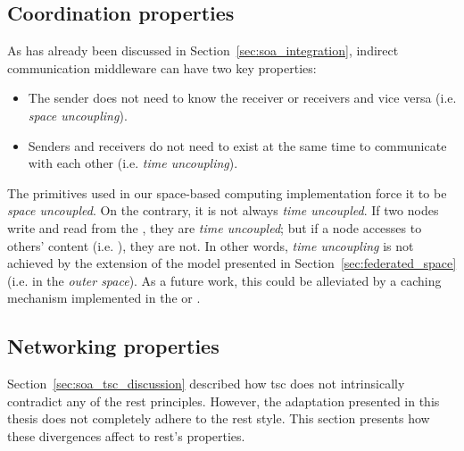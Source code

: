 \subsection{Coordination properties}
\label{sec:coordination_properties}

As has already been discussed in Section~\ref{sec:soa_integration}, indirect communication middleware can have two key properties:
\begin{itemize}
  \item The sender does not need to know the receiver or receivers and vice versa (i.e. \emph{space uncoupling}).
  \item Senders and receivers do not need to exist at the same time to communicate with each other (i.e. \emph{time uncoupling}).
\end{itemize}


The primitives used in our space-based computing implementation force it to be \emph{space uncoupled}.
On the contrary, it is not always \emph{time uncoupled}.
If two nodes write and read from the \coordspace{}, they are \emph{time uncoupled};
but if a node accesses to others' content (i.e. \selfgraphs{}), they are not.
In other words, \emph{time uncoupling} is not achieved by the extension of the model presented in Section~\ref{sec:federated_space} (i.e. in the \emph{outer space}).
As a future work, this could be alleviated by a caching mechanism implemented in the \coordinator{} or \coordinators{}. %




\subsection{Networking properties} %
\label{sec:network_properties}

Section~\ref{sec:soa_tsc_discussion} described how \ac{tsc} does not intrinsically contradict any of the \ac{rest} principles.
However, the adaptation presented in this thesis does not completely adhere to the \ac{rest} style.
This section presents how these divergences affect to \ac{rest}'s properties.



